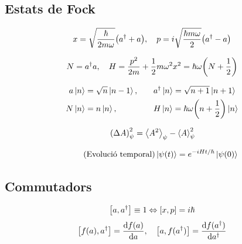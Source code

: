 \setcounter{section}{2}

\section{\mytitle}
\subsection{Estats de Fock}
\begin{align*}
	x = \sqrt{\frac{\hbar}{2m\omega}} \qty(a\sdag + a) \qc p = i \sqrt{\frac{\hbar m \omega}{2}} \qty(a\sdag - a)
\end{align*}

\begin{align*}
	N = a\sdag a \qc H = \frac{p^{2}}{2m} + \frac{1}{2} m \omega^{2} x^{2} = \hbar \omega \qty(N + \frac{1}{2})
\end{align*}

\begin{alignat*}{2}
	a \ket{n} &= \sqrt{n} \ket{n-1} \qc && a\sdag \ket{n} = \sqrt{n+1}\ket{n+1} \\
	N \ket{n} &= n \ket{n} \qc && H \ket{n}= \hbar \omega \qty(n+ \frac{1}{2}) \ket{n}
\end{alignat*}

\begin{align*}
	\qty(\Delta A)^{2}_{\psi} = \ev{A^2}_{\psi} - \ev{A}^{2}_{\psi}
\end{align*}

\begin{align}\tag{Evolució temporal}
	\ket{\psi (t)} = e^{-iHt/\hbar}\ket{\psi (0)}
\end{align}

\subsection{Commutadors}
\begin{align*}
	\qty[a, a^{\dagger}{}] \equiv 1 \Leftrightarrow \qty[x, p] = i\hbar
\end{align*}
\begin{align*}
	\qty[ f(a), a\sdag] = \dv{f(a)}{a} \qc \qty[a, f(a\sdag)] = \dv{f(a\sdag)}{a\sdag}
\end{align*}

